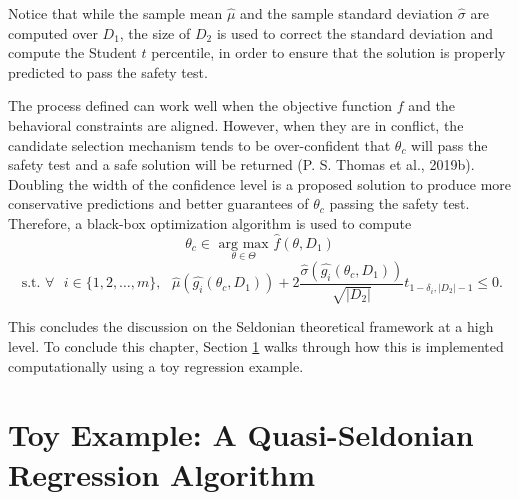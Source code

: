 \documentclass[12pt, twoside]{amherstthesis}
\begin{document}
Notice that while the sample mean \(\hat{\mu}\) and the sample standard deviation \(\hat{\sigma}\) are computed over \(D_1\), the size of \(D_2\) is used to correct the standard deviation and compute the Student \(t\) percentile, in order to ensure that the solution is properly predicted to pass the safety test.

The process defined can work well when the objective function \(f\) and the behavioral constraints are aligned. However, when they are in conflict, the candidate selection mechanism tends to be over-confident that \(\theta_c\) will pass the safety test and a safe solution will be returned (P. S. Thomas et al., 2019b). Doubling the width of the confidence level is a proposed solution to produce more conservative predictions and better guarantees of \(\theta_c\) passing the safety test. Therefore, a black-box optimization algorithm is used to compute
\begin{equation}
\label{ch2eq14}
\theta_c \in \underset{\theta \in \Theta}{\text{ arg max }} \hat{f}(\theta, D_1)
\end{equation}
\[\text{ s.t. } \forall \text{ } i \in \{1,2,\ldots,m\}, \text{  } \hat{\mu}(\hat{g_i}(\theta_c, D_1)) + 2\frac{\hat{\sigma}(\hat{g_i}(\theta_c, D_1))}{\sqrt{|D_2|}}t_{1-\delta_i, |D_2|-1} \leq 0.\]

\hfill\break

This concludes the discussion on the Seldonian theoretical framework at a high level. To conclude this chapter, Section \ref{toy} walks through how this is implemented computationally using a toy regression example.

\hypertarget{toy}{%
\section{Toy Example: A Quasi-Seldonian Regression Algorithm}\label{toy}}
\end{document}
